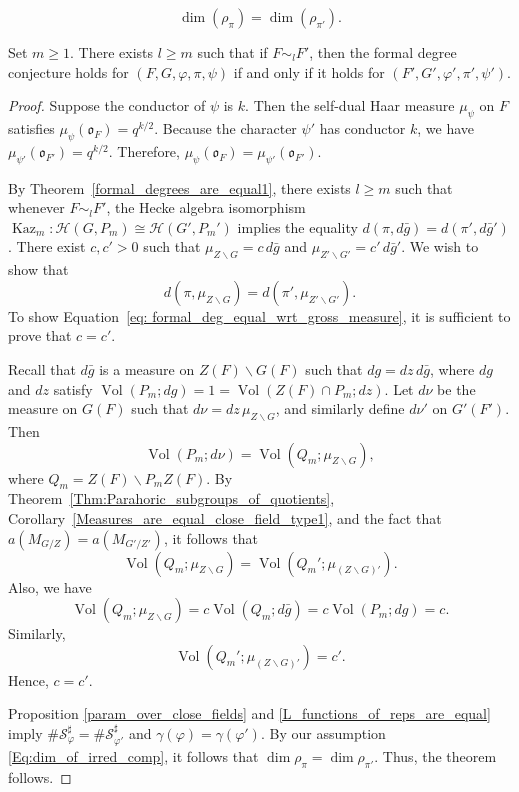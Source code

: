 \documentclass[10pt,a4paper]{amsart}
\DeclareMathOperator{\Kaz}{Kaz}
\DeclareMathOperator{\Vol}{Vol}
\begin{document}
\begin{equation}\label{Eq:dim_of_irred_comp}
    \dim(\rho_{\pi}) = \dim(\rho_{\pi'}).
\end{equation}

\begin{theorem}\label{thm:Formaldeg_conjecture_over_close_fields}
    Set $m \ge 1$. There exists $l \ge m$ such that if $F \sim_l F'$, then the formal degree conjecture holds for $(F, G, \varphi, \pi, \psi)$ if and only if it holds for $(F', G', \varphi', \pi', \psi')$.
\end{theorem}

\begin{proof}
Suppose the conductor of $\psi$ is $k$. Then the self-dual Haar measure $\mu_{\psi}$ on $F$ satisfies $\mu_{\psi}(\mathfrak{o}_F) = q^{k/2}$. Because the character $\psi'$ has conductor $k$, we have $\mu_{\psi'}(\mathfrak{o}_{F'}) = q^{k/2}$. Therefore, $\mu_{\psi}(\mathfrak{o}_F) = \mu_{\psi'}(\mathfrak{o}_{F'})$.

By Theorem~\ref{formal_degrees_are_equal1}, there exists $l \ge m$ such that whenever $F \sim_l F'$, the Hecke algebra isomorphism $\Kaz_m \colon \mathcal{H}(G,P_m) \cong \mathcal{H}(G',P_m')$ implies the equality $d(\pi, d\bar{g}) = d(\pi', d\bar{g}')$. There exist $c, c' > 0$ such that $\mu_{Z \backslash G} = c \, d\bar{g}$ and $\mu_{Z' \backslash G'} = c' \, d\bar{g}'$.
We wish to show that
\begin{equation}\label{eq: formal_deg_equal_wrt_gross_measure}
    d(\pi, \mu_{Z \backslash G}) = d(\pi', \mu_{Z' \backslash G'}).
\end{equation}
To show Equation~\ref{eq: formal_deg_equal_wrt_gross_measure}, it is sufficient to prove that $c = c'$.

Recall that $d\bar{g}$ is a measure on $Z(F) \backslash G(F)$ such that $dg = dz \, d\bar{g}$, where $dg$ and $dz$ satisfy $\Vol(P_m; dg) = 1 = \Vol(Z(F) \cap P_m; dz)$. Let $d\nu$ be the measure on $G(F)$ such that $d\nu = dz \, \mu_{Z \backslash G}$, and similarly define $d\nu'$ on $G'(F')$. Then
\[
\Vol(P_m; d\nu) = \Vol(Q_m; \mu_{Z \backslash G}),
\]
where $Q_m = Z(F) \backslash P_m Z(F)$. By Theorem~\ref{Thm:Parahoric_subgroups_of_quotients}, Corollary~\ref{Measures_are_equal_close_field_type1}, and the fact that $a(M_{G/Z}) = a(M_{G'/Z'})$, it follows that
\[
\Vol(Q_m; \mu_{Z \backslash G}) = \Vol(Q_m'; \mu_{(Z\backslash G)'}).
\]
Also, we have
\[
\Vol(Q_m; \mu_{Z \backslash G}) = c \Vol(Q_m; d\bar{g}) = c \Vol(P_m; dg) = c.
\]
Similarly,
\[
\Vol(Q_m'; \mu_{(Z \backslash G)'}) = c'.
\]
Hence, $c = c'$.



 Proposition \ref{param_over_close_fields} and \ref{L_functions_of_reps_are_equal} imply $\# \mathcal S_{\varphi}^{\sharp} = \# \mathcal{S_{\varphi'}^{\sharp}}$ and $\gamma(\varphi) = \gamma(\varphi').$ By our assumption \ref{Eq:dim_of_irred_comp}, it follows that $\dim \rho_{\pi} = \dim \rho_{\pi'}.$ Thus, the theorem follows.
 

\end{proof}
\end{document}
